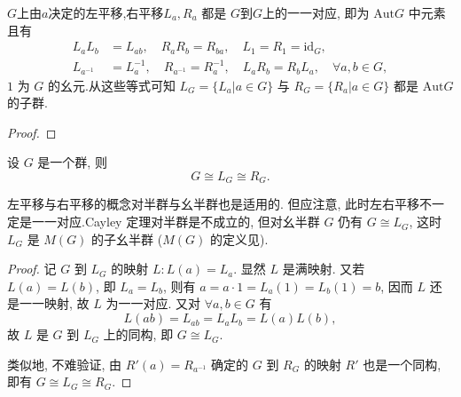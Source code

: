 \documentclass[../../main.tex]{subfiles}%
\begin{document}
\begin{proposition}\label{proposition:左右平移是群的自同构}
$G$上由$a$决定的左平移,右平移\( L_a, R_a \) 都是 \( G \)到$G$上的一一对应, 即为 \( \text{Aut}G \) 中元素且有
\begin{align*}
L_aL_b &= L_{ab}, \quad R_aR_b = R_{ba}, \quad L_1 = R_1 = \text{id}_G, \\
L_{a^{-1}} &= L_a^{-1}, \quad R_{a^{-1}} = R_a^{-1}, \quad L_aR_b = R_bL_a, \quad \forall a,b \in G,
\end{align*}
\( 1 \) 为 \( G \) 的幺元.从这些等式可知 \( L_G = \{L_a|a \in G\} \) 与 \( R_G = \{R_a|a \in G\} \) 都是 \( \text{Aut}G \) 的子群.
\end{proposition}
\begin{proof}



\end{proof}

\begin{theorem}[Cayley定理]\label{theorem:抽象代数-Cayley定理-定理 1.5.1}
设 \( G \) 是一个群, 则
\[
G \cong L_G \cong R_G.
\]
\end{theorem}
\begin{remark}
左平移与右平移的概念对半群与幺半群也是适用的. 但应注意, 此时左右平移不一定是一一对应.Cayley 定理对半群是不成立的, 但对幺半群 \( G \) 仍有 \( G \cong L_G \), 这时 \( L_G \) 是 \( M(G) \) 的子幺半群 (\( M(G) \) 的定义见).
\end{remark}
\begin{proof}

记 \( G \) 到 \( L_G \) 的映射 \( L: L(a) = L_a \). 显然 \( L \) 是满映射. 又若 \( L(a) = L(b) \), 即 \( L_a = L_b \), 则有 \( a = a \cdot 1 = L_a(1) = L_b(1) = b \), 因而 \( L \) 还是一一映射, 故 \( L \) 为一一对应. 又对 \( \forall a,b \in G \) 有
\[
L(ab) = L_{ab} = L_aL_b = L(a)L(b),
\]
故 \( L \) 是 \( G \) 到 \( L_G \) 上的同构, 即 \( G \cong L_G \).

类似地, 不难验证, 由 \( R'(a) = R_{a^{-1}} \) 确定的 \( G \) 到 \( R_G \) 的映射 \( R' \) 也是一个同构, 即有 \( G \cong L_G \cong R_G \).

\end{proof}
\end{document}

